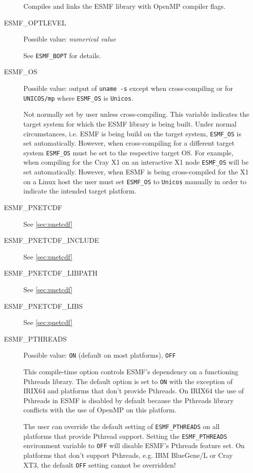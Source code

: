 \begin{description}
Compiles and links the ESMF library with OpenMP compiler flags.

\item[ESMF\_OPTLEVEL]
Possible value: {\em numerical value}

See {\tt ESMF\_BOPT} for details.

\item[ESMF\_OS]
Possible value: output of {\tt uname -s} except when cross-compiling or for
{\tt UNICOS/mp} where {\tt ESMF\_OS} is {\tt Unicos}.

Not normally set by user unless cross-compiling. This variable indicates the
target system for which the ESMF library is being built. Under normal
circumstances, i.e. ESMF is being build on the target system, {\tt ESMF\_OS} is
set automatically. However, when cross-compiling for a different target system
{\tt ESMF\_OS} must be set to the respective target OS. For example, when
compiling for the Cray X1 on an interactive X1 node {\tt ESMF\_OS} will be set
automatically. However, when ESMF is being cross-compiled for the X1 on a Linux
host the user must set {\tt ESMF\_OS} to {\tt Unicos} manually in order to
indicate the intended target platform.

\item[ESMF\_PNETCDF]
See \ref{sec:pnetcdf}

\item[ESMF\_PNETCDF\_INCLUDE]
See \ref{sec:pnetcdf}

\item[ESMF\_PNETCDF\_LIBPATH]
See \ref{sec:pnetcdf}

\item[ESMF\_PNETCDF\_LIBS]
See \ref{sec:pnetcdf}

\item[ESMF\_PTHREADS]
Possible value: {\tt ON} (default on most platforms), {\tt OFF}

This compile-time option controls ESMF's dependency on a functioning
Pthreads library. The default option is set to {\tt ON} with the exception
of IRIX64 and platforms that don't provide Pthreads. On IRIX64 the use of
Pthreads in ESMF is disabled by default because the Pthreads library conflicts
with the use of OpenMP on this platform.

The user can override the default setting of {\tt ESMF\_PTHREADS} on all
platforms that provide Pthread support. Setting the {\tt ESMF\_PTHREADS}
environment variable to {\tt OFF} will disable ESMF's Pthreads feature set.
On platforms that don't support Pthreads, e.g. IBM BlueGene/L or Cray XT3, the
default {\tt OFF} setting cannot be overridden!


\end{description}
